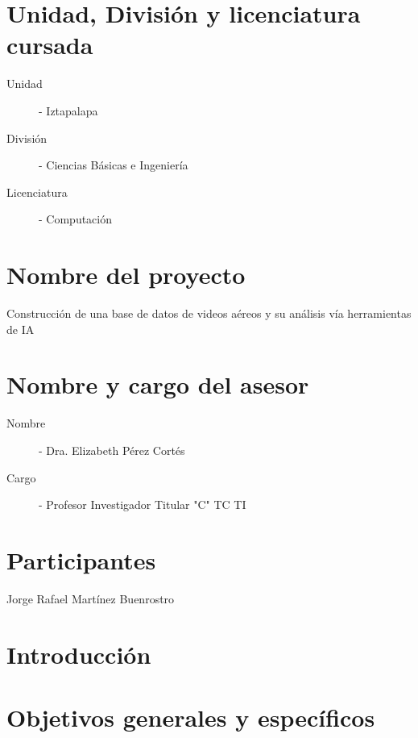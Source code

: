 \documentclass[letterpaper,11pt,twoside]{report}
\begin{document}
	\section{Unidad, Divisi\'on y licenciatura cursada}
	\begin{description}
		\item[Unidad] - Iztapalapa
		\item[Divisi\'on] - Ciencias B\'asicas e Ingenier\'ia
		\item[Licenciatura] - Computaci\'on   
	\end{description}


	\section{Nombre del proyecto}
	\noindent Construcci\'on de una base de datos de videos a\'ereos y su an\'alisis v\'ia herramientas de IA

	\section{Nombre y cargo del asesor}
	\begin{description}
		\item[Nombre] - Dra. Elizabeth P\'erez Cort\'es
		\item[Cargo] - Profesor Investigador Titular "C" TC TI
	\end{description}

	\section{Participantes}
	\noindent Jorge Rafael Mart\'inez Buenrostro

	\section{Introducci\'on}


	\section{Objetivos generales y espec\'ificos}
	






\end{document}
